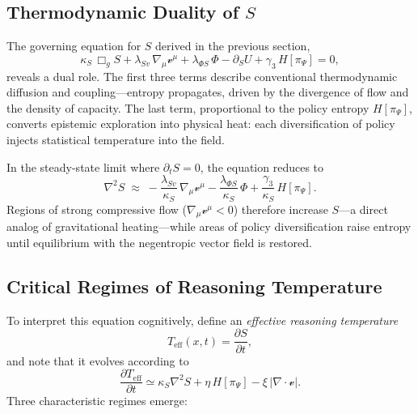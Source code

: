 \documentclass[11pt]{article}
\begin{document}
\subsection{Thermodynamic Duality of $S$}

The governing equation for $S$ derived in the previous section,
\[
\kappa_S\,\Box_g S
+\lambda_{Sv}\,\nabla_\mu \mathcal{v}^\mu
+\lambda_{\Phi S}\,\Phi
-\partial_S U
+\gamma_3\,H[\pi_\Psi]
=0,
\]
reveals a dual role.  
The first three terms describe conventional thermodynamic diffusion and coupling—entropy propagates, driven by the divergence of flow and the density of capacity.  
The last term, proportional to the policy entropy $H[\pi_\Psi]$, converts epistemic exploration into physical heat: each diversification of policy injects statistical temperature into the field.

In the steady-state limit where $\partial_t S = 0$, the equation reduces to
\[
\nabla^2 S \;\approx\; 
-\frac{\lambda_{Sv}}{\kappa_S}\,\nabla_\mu \mathcal{v}^\mu
-\frac{\lambda_{\Phi S}}{\kappa_S}\,\Phi
+\frac{\gamma_3}{\kappa_S}\,H[\pi_\Psi].
\]
Regions of strong compressive flow ($\nabla_\mu\mathcal{v}^\mu < 0$) therefore increase $S$—a direct analog of gravitational heating—while areas of policy diversification raise entropy until equilibrium with the negentropic vector field is restored.  

\subsection{Critical Regimes of Reasoning Temperature}

To interpret this equation cognitively, define an \emph{effective reasoning temperature}
\[
T_{\mathrm{eff}}(x,t) = \frac{\partial S}{\partial t},
\]
and note that it evolves according to
\[
\frac{\partial T_{\mathrm{eff}}}{\partial t} 
\simeq \kappa_S\nabla^2 S 
+ \eta\,H[\pi_\Psi]
- \xi\,|\nabla\!\cdot\!\mathcal{v}|.
\]
Three characteristic regimes emerge:
\end{document}
